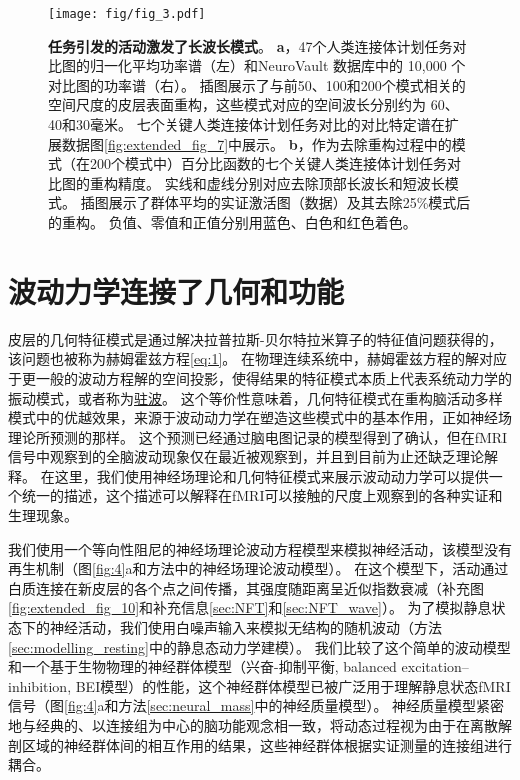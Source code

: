 \documentclass[lang=cn,a4paper,newtx]{elegantpaper}
\begin{document}
\begin{figure}[!htb]
	\centering
	\texttt{[image: fig/fig\_3.pdf]}
	\caption{\textbf{任务引发的活动激发了长波长模式}。
	\textbf{a}，47个人类连接体计划任务对比图的归一化平均功率谱（左）和NeuroVault 数据库中的 10,000 个对比图的功率谱（右）。
	插图展示了与前50、100和200个模式相关的空间尺度的皮层表面重构，这些模式对应的空间波长分别约为 60、40和30毫米。
	七个关键人类连接体计划任务对比的对比特定谱在扩展数据图\ref{fig:extended_fig_7}中展示。 
	\textbf{b}，作为去除重构过程中的模式（在200个模式中）百分比函数的七个关键人类连接体计划任务对比图的重构精度。
	实线和虚线分别对应去除顶部长波长和短波长模式。
	插图展示了群体平均的实证激活图（数据）及其去除25\%模式后的重构。
	负值、零值和正值分别用蓝色、白色和红色着色。
	} \label{fig:3}
\end{figure}


\section{波动力学连接了几何和功能}

皮层的几何特征模式是通过解决拉普拉斯-贝尔特拉米算子的特征值问题获得的，该问题也被称为赫姆霍兹方程\ref{eq:1}。
在物理连续系统中，赫姆霍兹方程的解对应于更一般的波动方程解的空间投影，使得结果的特征模式本质上代表系统动力学的振动模式，或者称为\href{https://baike.baidu.com/item/%E9%A9%BB%E6%B3%A2}{驻波}。
这个等价性意味着，几何特征模式在重构脑活动多样模式中的优越效果，来源于波动动力学在塑造这些模式中的基本作用，正如神经场理论所预测的那样。
这个预测已经通过脑电图记录的模型得到了确认，但在fMRI信号中观察到的全脑波动现象仅在最近被观察到，并且到目前为止还缺乏理论解释。
在这里，我们使用神经场理论和几何特征模式来展示波动动力学可以提供一个统一的描述，这个描述可以解释在fMRI可以接触的尺度上观察到的各种实证和生理现象。


我们使用一个等向性阻尼的神经场理论波动方程模型来模拟神经活动，该模型没有再生机制（图\ref{fig:4}a和方法中的神经场理论波动模型）。
在这个模型下，活动通过白质连接在新皮层的各个点之间传播，其强度随距离呈近似指数衰减（补充图\ref{fig:extended_fig_10}和补充信息\ref{sec:NFT}和\ref{sec:NFT_wave}）。
为了模拟静息状态下的神经活动，我们使用白噪声输入来模拟无结构的随机波动（方法\ref{sec:modelling_resting}中的静息态动力学建模）。
我们比较了这个简单的波动模型和一个基于生物物理的神经群体模型（兴奋-抑制平衡, balanced excitation–inhibition, BEI模型）的性能，这个神经群体模型已被广泛用于理解静息状态fMRI信号（图\ref{fig:4}a和方法\ref{sec:neural_mass}中的神经质量模型）。
神经质量模型紧密地与经典的、以连接组为中心的脑功能观念相一致，将动态过程视为由于在离散解剖区域的神经群体间的相互作用的结果，这些神经群体根据实证测量的连接组进行耦合。
\end{document}
